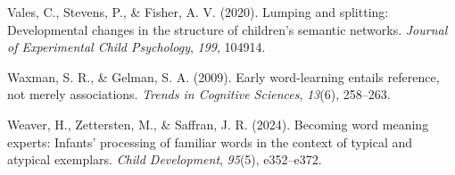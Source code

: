 \documentclass[
  man,mask]{apa6}
\newlength{\cslhangindent}
\newenvironment{CSLReferences}[2] %
 {\begin{list}{}{%
  \setlength{\itemindent}{0pt}
  \setlength{\leftmargin}{0pt}
  \setlength{\parsep}{0pt}
  \ifodd #1
   \setlength{\leftmargin}{\cslhangindent}
   \setlength{\itemindent}{-1\cslhangindent}
  \fi
  \setlength{\itemsep}{#2\baselineskip}}}
 {\end{list}}
\begin{document}
\begin{CSLReferences}{1}{0}
Vales, C., Stevens, P., \& Fisher, A. V. (2020). Lumping and splitting: {Developmental} changes in the structure of children's semantic networks. \emph{Journal of Experimental Child Psychology}, \emph{199}, 104914.

Waxman, S. R., \& Gelman, S. A. (2009). Early word-learning entails reference, not merely associations. \emph{Trends in Cognitive Sciences}, \emph{13}(6), 258--263.

Weaver, H., Zettersten, M., \& Saffran, J. R. (2024). Becoming word meaning experts: Infants' processing of familiar words in the context of typical and atypical exemplars. \emph{Child Development}, \emph{95}(5), e352--e372.

\end{CSLReferences}


\clearpage
\renewcommand{\listfigurename}{Figure captions}
\end{document}
